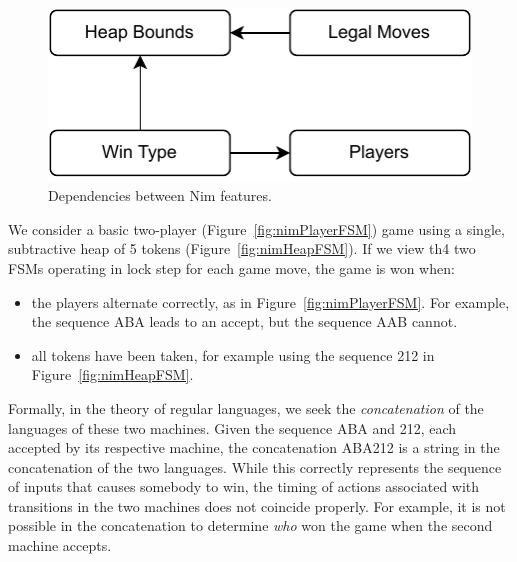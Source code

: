 \documentclass[sigplan,anonymous, review]{acmart}
\begin{document}
\begin{figure}
    \centering
    \includegraphics[width=0.6\linewidth]{figures/NimFeatures.pdf}
    \caption{Dependencies between Nim features.}
    \label{fig:nimDependencies}
\end{figure}

We consider a basic two-player (Figure~\ref{fig:nimPlayerFSM}) game using a single, subtractive heap of 5 tokens (Figure~\ref{fig:nimHeapFSM}).
If we view th4 two FSMs operating in lock step for each game move, the game is won when:
\begin{itemize}
    \item the players alternate correctly, as in Figure~\ref{fig:nimPlayerFSM}.  For example, the sequence ABA leads to an accept, but the sequence AAB cannot.
    \item all tokens have been taken, for example using the sequence 212 in Figure~\ref{fig:nimHeapFSM}.
\end{itemize}
Formally, in the theory of regular languages, we seek the \emph{concatenation} of the languages of these two machines.   Given the sequence ABA and 212, each accepted by its respective machine, the concatenation ABA212 is a string in the concatenation of the two languages.  While this correctly represents the sequence of inputs that causes somebody to win, the timing of actions associated with transitions in the two machines does not coincide properly.  For example, it is not possible in the concatenation to determine \emph{who} won the game when the second machine accepts. 
\end{document}
